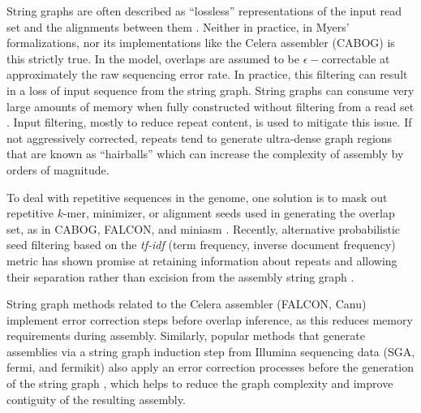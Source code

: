 String graphs are often described as ``lossless'' representations of the input read set and the alignments between them \cite{li2012exploring}.
Neither in practice, in Myers' formalizations, nor its implementations like the Celera assembler (CABOG) \cite{miller2008aggressive} is this strictly true.
In the model, overlaps are assumed to be $\epsilon-$correctable at approximately the raw sequencing error rate.
In practice, this filtering can result in a loss of input sequence from the string graph.
String graphs can consume very large amounts of memory when fully constructed without filtering from a read set \cite{li2016minimap,koren2017canu}.
Input filtering, mostly to reduce repeat content, is used to mitigate this issue.
If not aggressively corrected, repeats tend to generate ultra-dense graph regions that are known as ``hairballs'' which can increase the complexity of assembly by orders of magnitude.

To deal with repetitive sequences in the genome, one solution is to mask out repetitive $k$-mer, minimizer, or alignment seeds used in generating the overlap set, as in CABOG, FALCON, and miniasm \cite{miller2008aggressive,chin2016phased,li2016minimap}.
Recently, alternative probabilistic seed filtering based on the \emph{tf-idf} (term frequency, inverse document frequency) metric has shown promise at retaining information about repeats and allowing their separation rather than excision from the assembly string graph \cite{koren2017canu}.

String graph methods related to the Celera assembler (FALCON, Canu) implement error correction steps before overlap inference, as this reduces memory requirements during assembly.
Similarly, popular methods that generate assemblies via a string graph induction step from Illumina sequencing data (SGA, fermi, and fermikit) also apply an error correction processes before the generation of the string graph \cite{simpson2012efficient,simpson2014exploring,li2015fermikit}, which helps to reduce the graph complexity and improve contiguity of the resulting assembly.

